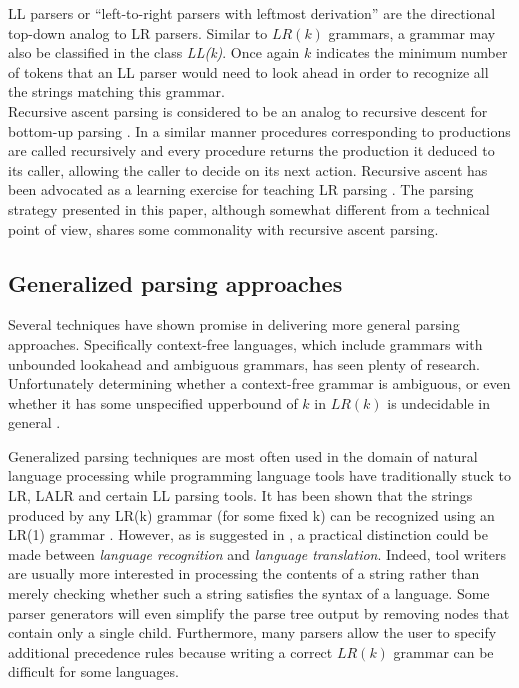 \documentclass[envcountsame,runningheads]{llncs}
\begin{document}
LL parsers or ``left-to-right parsers with leftmost derivation'' are the directional top-down analog to LR parsers.
Similar to $LR(k)$ grammars, a grammar may also be classified in the class \emph{LL(k)}.
Once again $k$ indicates the minimum number of tokens that an LL parser would need to look ahead in order to recognize all the strings matching this grammar.\\

Recursive ascent parsing is considered to be an analog to recursive descent for bottom-up parsing \cite{47909}.
In a similar manner procedures corresponding to productions are called recursively and every procedure returns the production it deduced to its caller, allowing the caller to decide on its next action.
Recursive ascent has been advocated as a learning exercise for teaching LR parsing \cite{770849}.
The parsing strategy presented in this paper, although somewhat different from a technical point of view, shares some commonality with recursive ascent parsing.

\subsection{Generalized parsing approaches}

Several techniques have shown promise in delivering more general parsing approaches.
Specifically context-free languages, which include grammars with unbounded lookahead and ambiguous grammars, has seen plenty of research.
Unfortunately determining whether a context-free grammar is ambiguous, or even whether it has some unspecified upperbound of $k$ in $LR(k)$ is undecidable in general \cite{knuth65}.

Generalized parsing techniques are most often used in the domain of natural language processing while programming language tools have traditionally stuck to LR, LALR and certain LL parsing tools.
It has been shown that the strings produced by any LR(k) grammar (for some fixed k) can be recognized using an LR(1) grammar \cite{knuth65}.
However, as is suggested in \cite{Parr95lland}, a practical distinction could be made between \emph{language recognition} and \emph{language translation}.
Indeed, tool writers are usually more interested in processing the contents of a string rather than merely checking whether such a string satisfies the syntax of a language.
Some parser generators will even simplify the parse tree output by removing nodes that contain only a single child. %
Furthermore, many parsers allow the user to specify additional precedence rules because writing a correct $LR(k)$ grammar can be difficult for some languages.
\end{document}
